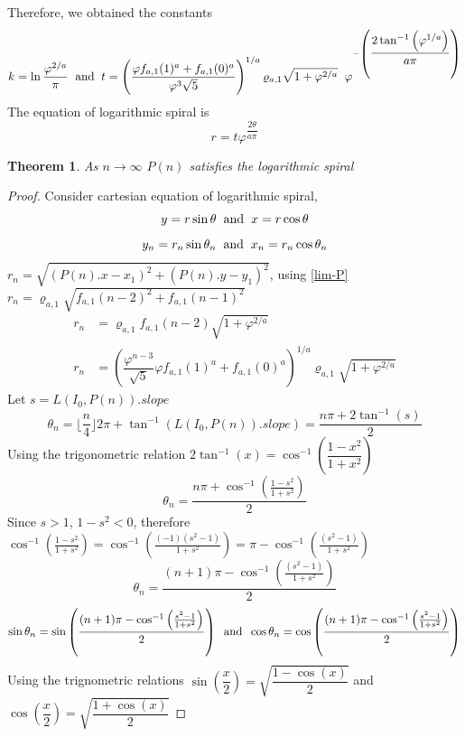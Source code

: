 \documentclass[preprint,12pt]{elsarticle}
\newtheorem{theorem}{Theorem}[section]
\begin{document}
Therefore, we obtained the constants $$k = \ln{\dfrac{\varphi^{2/a}}{\pi}} \hspace{2mm}\text{and}\hspace{2mm}t=\left(\dfrac{\varphi f_{a,1}(1)^a+f_{a,1}(0)^a}{\varphi^{3}\sqrt{5}}\right)^{1/a}\varrho_{a,1}\sqrt{1 + \varphi^{2/a}}\hspace{2mm}\varphi^{-\left(\dfrac{ 2\tan^{-1}{\left(\varphi^{1/a}\right)}}{a\pi}\right)}$$
The equation of logarithmic spiral is $$r = t\varphi^{\dfrac{2\theta}{a\pi}}$$
\begin{theorem}
	As $n \to \infty$ $P(n)$ satisfies the logarithmic spiral
\end{theorem}
\begin{proof}
	Consider cartesian equation of logarithmic spiral, $$y = r\sin{\theta} \hspace{2mm}\text{and}\hspace{2mm}x = r\cos{\theta}$$
	$$y_n = r_n\sin{\theta_n} \hspace{2mm}\text{and}\hspace{2mm}x_n = r_n\cos{\theta_n}$$
	$r_n = \sqrt{(P(n).x - x_1)^2 + (P(n).y - y_1)^2}$, using \ref*{lim-P}\\
	$r_n = \varrho_{a,1}\sqrt{f_{a,1}(n-2)^2+f_{a,1}(n-1)^2}$\\
	\begin{align*}
		r_n &=\varrho_{a,1}f_{a,1}(n-2)\sqrt{1+\varphi^{2/a}}\\
		r_n &=\left(\dfrac{\varphi^{n-3}}{\sqrt{5}}\varphi f_{a,1}(1)^a+f_{a,1}(0)^a\right)^{1/a}\varrho_{a,1}\sqrt{1+\varphi^{2/a}}
	\end{align*}
	Let $s = L(I_0, P(n)).slope$
	$$\theta_n = \lfloor\dfrac{n}{4}\rfloor 2\pi + \tan^{-1}(L(I_0, P(n)).slope) = \dfrac{n\pi + 2\tan^{-1}(s)}{2}$$
	Using the trigonometric relation $2\tan^{-1}(x) = \cos^{-1}\left(\dfrac{1-x^2}{1+x^2}\right)$
	$$\theta_n = \dfrac{n\pi + \cos^{-1}\left(\frac{1-s^2}{1+s^2}\right)}{2}$$
	Since $s > 1$, $1 - s^2 < 0$, therefore $\cos^{-1}\left(\frac{1-s^2}{1+s^2}\right) = \cos^{-1}\left(\frac{(-1)(s^2-1)}{1+s^2}\right) = \pi - \cos^{-1}\left(\frac{(s^2-1)}{1+s^2}\right)$
	$$\theta_n = \dfrac{(n+1)\pi - \cos^{-1}\left(\frac{(s^2-1)}{1+s^2}\right)}{2}$$
	$$\sin\theta_n = \sin\left(\dfrac{(n+1)\pi - \cos^{-1}\left(\frac{s^2-1}{1+s^2}\right)}{2}\right)\hspace{2mm}\text{and}\hspace{2mm}\cos\theta_n = \cos\left(\dfrac{(n+1)\pi - \cos^{-1}\left(\frac{s^2-1}{1+s^2}\right)}{2}\right)$$
	Using the trignometric relations $\sin\left(\dfrac{x}{2}\right) = \sqrt{\dfrac{1 - \cos(x)}{2}}$ and $\cos\left(\dfrac{x}{2}\right) = \sqrt{\dfrac{1 + \cos(x)}{2}}$

\end{proof}
\end{document}
